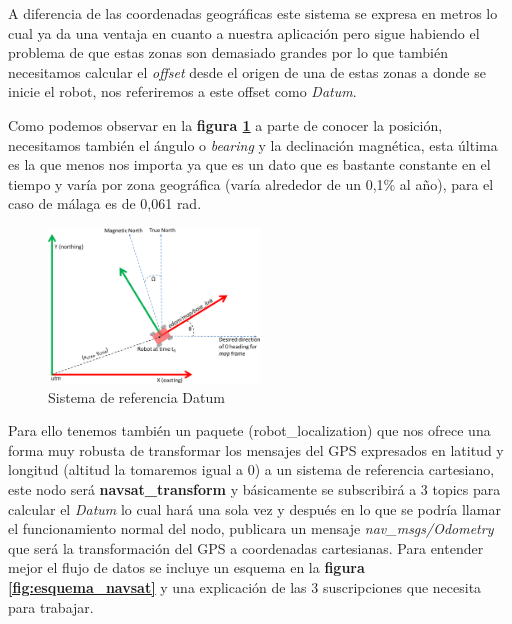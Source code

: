 A diferencia de las coordenadas geográficas este sistema se expresa en metros lo cual ya da una ventaja en cuanto a nuestra aplicación pero 
sigue habiendo el problema de que estas zonas son demasiado grandes por lo que también necesitamos calcular el \textit{offset} desde el 
origen de una de estas zonas a donde se inicie el robot, nos referiremos a este offset como \textit{Datum}.

Como podemos observar en la \textbf{figura \ref{fig:datum}} a parte de conocer la posición, necesitamos también el ángulo o \textit{bearing} 
y la declinación magnética, esta última es la que menos nos importa ya que es un dato que es bastante constante en el tiempo y varía por 
zona geográfica (varía alrededor de un 0,1\% al año), para el caso de málaga es de 0,061 rad.



\begin{figure}[h]
    \centering
    \includegraphics[width=0.5\textwidth]{images/navsat_transform.png}
    \caption{Sistema de referencia Datum}
    \label{fig:datum}
\end{figure}


Para ello tenemos también un paquete (robot\_localization) que nos 
ofrece una forma muy robusta de transformar los mensajes del GPS expresados en latitud y longitud (altitud la tomaremos igual a 0) a un 
sistema de referencia cartesiano, este nodo será \textbf{navsat\_transform} y básicamente se subscribirá a 3 topics para calcular 
el \textit{Datum} lo cual hará una sola vez y después en lo que se podría llamar el funcionamiento normal del nodo, publicara un mensaje 
\textit{nav\_msgs/Odometry} que será la transformación del GPS a coordenadas cartesianas. Para entender mejor el flujo de datos se incluye 
un esquema en la \textbf{figura \ref{fig:esquema_navsat}} y una explicación de las 3 suscripciones que necesita para trabajar.

